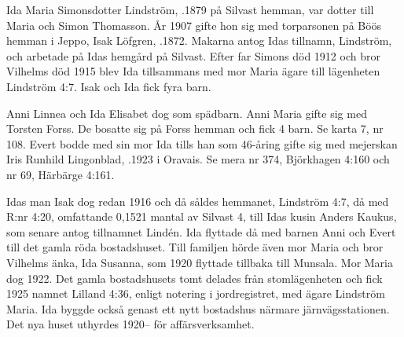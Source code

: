 Ida Maria Simonsdotter Lindström, .1879 på Silvast hemman, var dotter till Maria och Simon Thomasson. År 1907 gifte hon sig med torparsonen på Böös hemman i Jeppo, Isak Löfgren, .1872. Makarna antog Idas tillnamn, Lindström, och arbetade på Idas hemgård på Silvast. Efter far Simons död 1912 och bror Vilhelms död 1915 blev Ida tillsammans med mor Maria ägare till lägenheten Lindström 4:7. Isak och Ida fick fyra barn.
\begin{jhchildren}
  \item {}
  \item {}
  \item {}
  \item {}
\end{jhchildren}
Anni Linnea och Ida Elisabet dog som spädbarn. Anni Maria gifte sig med Torsten Forss. De bosatte sig på Forss hemman och fick 4 barn. Se karta 7, nr 108. Evert bodde med sin mor Ida tills han som 46-åring gifte sig med mejerskan Iris Runhild Lingonblad, .1923 i Oravais. Se mera nr 374, Björkhagen 4:160 och nr 69, Härbärge 4:161.

Idas man Isak dog redan 1916 och då såldes hemmanet, Lindström 4:7, då med R:nr 4:20, omfattande 0,1521 mantal av Silvast 4, till Idas kusin Anders Kaukus, som senare antog tillnamnet Lindén. Ida flyttade då med barnen Anni och Evert till det gamla röda bostadshuset. Till familjen hörde även mor Maria och bror Vilhelms änka, Ida Susanna, som 1920 flyttade tillbaka till Munsala. Mor Maria dog 1922. Det gamla bostadshusets tomt delades från stomlägenheten och fick 1925 namnet Lilland 4:36, enligt notering i jordregistret, med ägare Lindström Maria. Ida byggde också genast ett nytt bostadshus närmare järnvägsstationen. Det nya huset uthyrdes 1920-- för affärsverksamhet.


